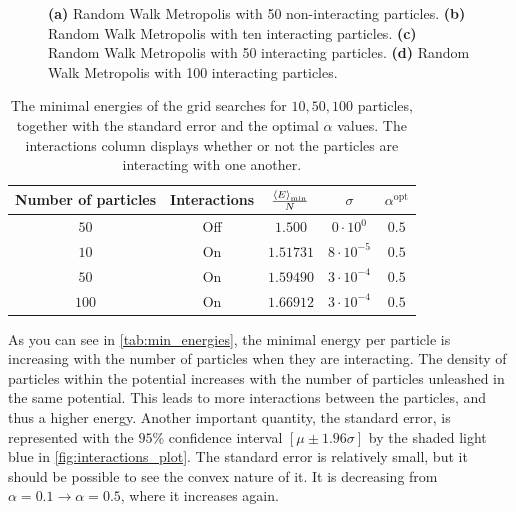 \begin{figure}[!htb]
\qquad
{}
\caption{\textbf{(a)} Random Walk Metropolis with 50 non-interacting particles. \textbf{(b)} Random Walk Metropolis with ten interacting particles. \textbf{(c)} Random Walk Metropolis with 50 interacting particles. \textbf{(d)} Random Walk Metropolis with 100 interacting particles.}
\label{fig:interactions_plot}
\end{figure}

\begin{table}[H]
    \centering
    \begin{tabular}{ccccc}
    \hline \hline
        Number of particles & Interactions & $\frac{\expval{E}_{\mathrm{min}}}{N}$ & $\sigma$ & $\alpha^{\mathrm{opt}}$\\
    \hline \hline
        $50$ & Off & $1.500$ & $0\cdot10^{0}$ & $0.5$\\
        $10$ & On & $1.51731$& $8\cdot10^{-5}$& $0.5$ \\
        $50$ & On & $1.59490$& $3\cdot10^{-4}$ &$0.5$ \\
        $100$ & On & $1.66912$ & $3\cdot10^{-4}$ & $0.5$ \\
    \hline \hline
    \end{tabular}
    \caption{The minimal energies of the grid searches for $10, 50, 100$ particles, together with the standard error and the optimal $\alpha$ values. The interactions column displays whether or not the particles are interacting with one another.}
    \label{tab:min_energies}
\end{table}

As you can see in \autoref{tab:min_energies}, the minimal energy per particle is increasing with the number of particles when they are interacting. The density of particles within the potential increases with the number of particles unleashed in the same potential. This leads to more interactions between the particles, and thus a higher energy. Another important quantity, the standard error, is represented with the $95$\% confidence interval $[\mu\pm1.96\sigma]$ by the shaded light blue in \autoref{fig:interactions_plot}. The standard error is relatively small, but it should be possible to see the convex nature of it. It is decreasing from $\alpha=0.1\to\alpha=0.5$, where it increases again. 


